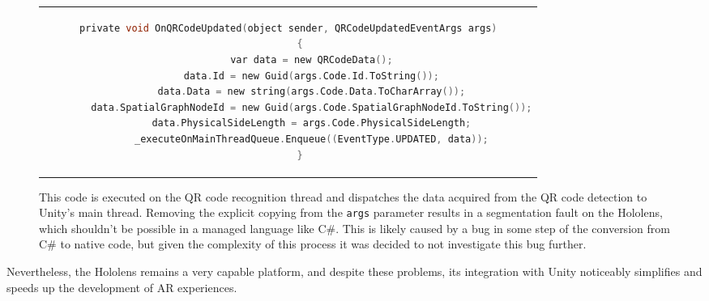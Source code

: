 \begin{figure}[p]
  \centering
  \begin{tabular}{c}
  \begin{lstlisting}[language=c]
    private void OnQRCodeUpdated(object sender, QRCodeUpdatedEventArgs args)
    {
        var data = new QRCodeData();
        data.Id = new Guid(args.Code.Id.ToString());
        data.Data = new string(args.Code.Data.ToCharArray());
        data.SpatialGraphNodeId = new Guid(args.Code.SpatialGraphNodeId.ToString());
        data.PhysicalSideLength = args.Code.PhysicalSideLength;
        _executeOnMainThreadQueue.Enqueue((EventType.UPDATED, data));
    }
    \end{lstlisting}
  \end{tabular}
  \caption{This code is executed on the QR code recognition thread and dispatches the data acquired from the QR code detection to Unity's main thread. Removing the explicit copying from the \texttt{args} parameter results in a segmentation fault on the Hololens, which shouldn't be possible in a managed language like C\#. This is likely caused by a bug in some step of the conversion from C\# to native code, but given the complexity of this process it was decided to not investigate this bug further.}\label{lst:qr_code_segfault}
\end{figure}

Nevertheless, the Hololens remains a very capable platform, and despite these problems, its integration with Unity noticeably simplifies and speeds up the development of \gls{AR} experiences.